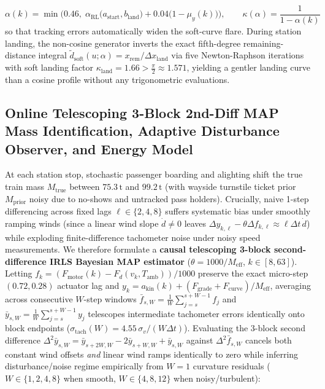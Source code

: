 \documentclass[10pt,a4paper]{article}
\begin{document}
\begin{equation}
\alpha(k) = \min\Big(0.46, \; \alpha_{\text{RL}}\big(a_{\text{start}}, b_{\text{land}}\big) + 0.04\big(1 - \mu_y(k)\big)\Big), \qquad \kappa(\alpha) = \frac{1}{1-\alpha(k)}
\label{eq:soft_alpha}
\end{equation}
so that tracking errors automatically widen the soft-curve flare. During station landing, the non-cosine generator inverts the exact fifth-degree remaining-distance integral $\tilde{d}_{\text{soft}}(u; \alpha) = x_{\text{rem}} / \Delta x_{\text{land}}$ via five Newton-Raphson iterations with soft landing factor $\kappa_{\text{land}} = 1.66 > \frac{\pi}{2} \approx 1.571$, yielding a gentler landing curve than a cosine profile without any trigonometric evaluations.

\subsection{Online Telescoping 3-Block 2nd-Diff MAP Mass Identification, Adaptive Disturbance Observer, and Energy Model}
At each station stop, stochastic passenger boarding and alighting shift the true train mass $M_{\text{true}}$ between $75.3\,\text{t}$ and $99.2\,\text{t}$ (with wayside turnstile ticket prior $M_{\text{prior}}$ noisy due to no-shows and untracked pass holders). Crucially, naive 1-step differencing across fixed lags $\ell \in \{2,4,8\}$ suffers systematic bias under smoothly ramping winds (since a linear wind slope $\dot{d} \neq 0$ leaves $\Delta y_{k,\ell} - \theta\Delta f_{k,\ell} \approx \ell\Delta t\,\dot{d}$) while exploding finite-difference tachometer noise under noisy speed measurements. We therefore formulate a \textbf{causal telescoping 3-block second-difference IRLS Bayesian MAP estimator} ($\theta = 1000 / M_{\text{eff}}$, $k \in [8, 63]$). Letting $f_k = (F_{\text{motor}}(k) - F_d(v_k, T_{\text{amb}}))/1000$ preserve the exact micro-step $(0.72, 0.28)$ actuator lag and $y_k = a_{\text{kin}}(k) + (F_{\text{grade}} + F_{\text{curve}})/M_{\text{eff}}$, averaging across consecutive $W$-step windows $\bar{f}_{s,W} = \frac{1}{W}\sum_{j=s}^{s+W-1} f_j$ and $\bar{y}_{s,W} = \frac{1}{W}\sum_{j=s}^{s+W-1} y_j$ telescopes intermediate tachometer errors identically onto block endpoints ($\sigma_{\text{tach}}(W) = 4.55\,\sigma_v / (W\Delta t)$). Evaluating the 3-block second difference $\Delta^2 \bar{y}_{s,W} = \bar{y}_{s+2W,W} - 2\bar{y}_{s+W,W} + \bar{y}_{s,W}$ against $\Delta^2 \bar{f}_{s,W}$ cancels both constant wind offsets \emph{and} linear wind ramps identically to zero while inferring disturbance/noise regime empirically from $W=1$ curvature residuals ($W \in \{1,2,4,8\}$ when smooth, $W \in \{4,8,12\}$ when noisy/turbulent):
\end{document}
